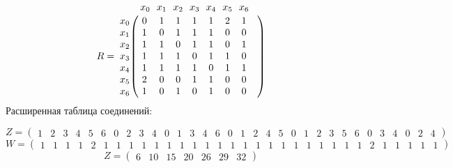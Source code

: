 \documentclass{article}
\begin{document}
$$
R =
\bordermatrix{ & x_{0} \!&\! x_{1} \!&\! x_{2} \!&\! x_{3} \!&\! x_{4} \!&\! x_{5} \!&\! x_{6} \!&\! \cr 
x_{0} \!&\! 0 \!&\! 1 \!&\! 1 \!&\! 1 \!&\! 1 \!&\! 2 \!&\! 1 \!&\! \cr
x_{1} \!&\! 1 \!&\! 0 \!&\! 1 \!&\! 1 \!&\! 1 \!&\! 0 \!&\! 0 \!&\! \cr
x_{2} \!&\! 1 \!&\! 1 \!&\! 0 \!&\! 1 \!&\! 1 \!&\! 0 \!&\! 1 \!&\! \cr
x_{3} \!&\! 1 \!&\! 1 \!&\! 1 \!&\! 0 \!&\! 1 \!&\! 1 \!&\! 0 \!&\! \cr
x_{4} \!&\! 1 \!&\! 1 \!&\! 1 \!&\! 1 \!&\! 0 \!&\! 1 \!&\! 1 \!&\! \cr
x_{5} \!&\! 2 \!&\! 0 \!&\! 0 \!&\! 1 \!&\! 1 \!&\! 0 \!&\! 0 \!&\! \cr
x_{6} \!&\! 1 \!&\! 0 \!&\! 1 \!&\! 0 \!&\! 1 \!&\! 0 \!&\! 0 \!&\! \cr
}$$
Расширенная таблица соединений:

$$
 Z =\left(
\begin{array}{cccccccccccccccccccccccccccccccc}
1 \!&\! 2 \!&\! 3 \!&\! 4 \!&\! 5 \!&\! 6 \!&\! 0 \!&\! 2 \!&\! 3 \!&\! 4 \!&\! 0 \!&\! 1 \!&\! 3 \!&\! 4 \!&\! 6 \!&\! 0 \!&\! 1 \!&\! 2 \!&\! 4 \!&\! 5 \!&\! 0 \!&\! 1 \!&\! 2 \!&\! 3 \!&\! 5 \!&\! 6 \!&\! 0 \!&\! 3 \!&\! 4 \!&\! 0 \!&\! 2 \!&\! 4 
\end{array}
\right)$$
$$
 W =\left(
\begin{array}{cccccccccccccccccccccccccccccccc}
1 \!&\! 1 \!&\! 1 \!&\! 1 \!&\! 2 \!&\! 1 \!&\! 1 \!&\! 1 \!&\! 1 \!&\! 1 \!&\! 1 \!&\! 1 \!&\! 1 \!&\! 1 \!&\! 1 \!&\! 1 \!&\! 1 \!&\! 1 \!&\! 1 \!&\! 1 \!&\! 1 \!&\! 1 \!&\! 1 \!&\! 1 \!&\! 1 \!&\! 1 \!&\! 2 \!&\! 1 \!&\! 1 \!&\! 1 \!&\! 1 \!&\! 1 
\end{array}
\right)$$
$$
 Z =\left(
\begin{array}{ccccccc}
6 \!&\! 10 \!&\! 15 \!&\! 20 \!&\! 26 \!&\! 29 \!&\! 32 
\end{array}
\right)$$
\end{document}
